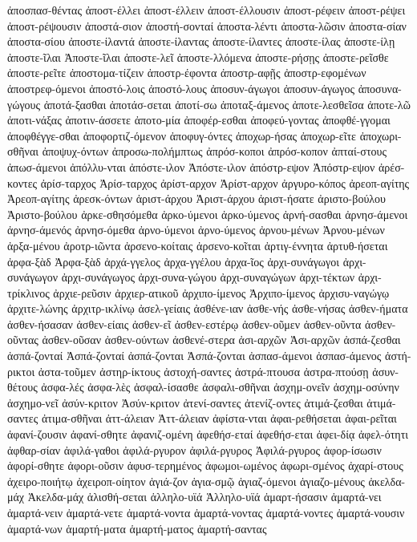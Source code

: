 {ἀποσπασ-θέντας
ἀποστ-έλλει
ἀποστ-έλλειν
ἀποστ-έλλουσιν
ἀποστ-ρέφειν
ἀποστ-ρέψει
ἀποστ-ρέψουσιν
ἀποστά-σιον
ἀποστή-σονταί
ἀποστα-λέντι
ἀποστα-λῶσιν
ἀποστα-σίαν
ἀποστα-σίου
ἀποστε-ίλαντά
ἀποστε-ίλαντας
ἀποστε-ίλαντες
ἀποστε-ίλας
ἀποστε-ίλῃ
ἀποστε-ῖλαι
Ἀποστε-ῖλαι
ἀποστε-λεῖ
ἀποστε-λλόμενα
ἀποστε-ρήσῃς
ἀποστε-ρεῖσθε
ἀποστε-ρεῖτε
ἀποστομα-τίζειν
ἀποστρ-έφοντα
ἀποστρ-αφῇς
ἀποστρ-εφομένων
ἀποστρεφ-όμενοι
ἀποστό-λοις
ἀποστό-λους
ἀποσυν-άγωγοι
ἀποσυν-άγωγος
ἀποσυνα-γώγους
ἀποτά-ξασθαι
ἀποτάσ-σεται
ἀποτί-σω
ἀποταξ-άμενος
ἀποτε-λεσθεῖσα
ἀποτε-λῶ
ἀποτι-νάξας
ἀποτιν-άσσετε
ἀποτο-μία
ἀποφέρ-εσθαι
ἀποφεύ-γοντας
ἀποφθέ-γγομαι
ἀποφθέγγε-σθαι
ἀποφορτιζ-όμενον
ἀποφυγ-όντες
ἀποχωρ-ήσας
ἀποχωρ-εῖτε
ἀποχωρι-σθῆναι
ἀποψυχ-όντων
ἀπροσω-πολήμπτως
ἀπρόσ-κοποι
ἀπρόσ-κοπον
ἀπταί-στους
ἀπωσ-άμενοι
ἀπόλλυ-νται
ἀπόστε-ιλον
Ἀπόστε-ιλον
ἀπόστρ-εψον
Ἀπόστρ-εψον
ἀρέσ-κοντες
ἀρίσ-ταρχος
Ἀρίσ-ταρχος
ἀρίστ-αρχον
Ἀρίστ-αρχον
ἀργυρο-κόπος
ἀρεοπ-αγίτης
Ἀρεοπ-αγίτης
ἀρεσκ-όντων
ἀριστ-άρχου
Ἀριστ-άρχου
ἀριστ-ήσατε
ἀριστο-βούλου
Ἀριστο-βούλου
ἀρκε-σθησόμεθα
ἀρκο-ύμενοι
ἀρκο-ύμενος
ἀρνή-σασθαι
ἀρνησ-άμενοι
ἀρνησ-άμενός
ἀρνησ-όμεθα
ἀρνο-ύμενοι
ἀρνο-ύμενος
ἀρνου-μένων
Ἀρνου-μένων
ἀρξα-μένου
ἀροτρ-ιῶντα
ἀρσενο-κοίταις
ἀρσενο-κοῖται
ἀρτιγ-έννητα
ἀρτυθ-ήσεται
ἀρφα-ξὰδ
Ἀρφα-ξὰδ
ἀρχά-γγελος
ἀρχα-γγέλου
ἀρχα-ῖος
ἀρχι-συνάγωγοι
ἀρχι-συνάγωγον
ἀρχι-συνάγωγος
ἀρχι-συνα-γώγου
ἀρχι-συναγώγων
ἀρχι-τέκτων
ἀρχι-τρίκλινος
ἀρχιε-ρεῦσιν
ἀρχιερ-ατικοῦ
ἀρχιπο-ίμενος
Ἀρχιπο-ίμενος
ἀρχισυ-ναγώγῳ
ἀρχιτε-λώνης
ἀρχιτρ-ικλίνῳ
ἀσελ-γείαις
ἀσθένε-ιαν
ἀσθε-νής
ἀσθε-νήσας
ἀσθεν-ήματα
ἀσθεν-ήσασαν
ἀσθεν-είαις
ἀσθεν-εῖ
ἀσθεν-εστέρῳ
ἀσθεν-οῦμεν
ἀσθεν-οῦντα
ἀσθεν-οῦντας
ἀσθεν-οῦσαν
ἀσθεν-ούντων
ἀσθενέ-στερα
ἀσι-αρχῶν
Ἀσι-αρχῶν
ἀσπά-ζεσθαι
ἀσπά-ζονταί
Ἀσπά-ζονταί
ἀσπά-ζονται
Ἀσπά-ζονται
ἀσπασ-άμενοι
ἀσπασ-άμενος
ἀστή-ρικτοι
ἀστα-τοῦμεν
ἀστηρ-ίκτους
ἀστοχή-σαντες
ἀστρά-πτουσα
ἀστρα-πτούσῃ
ἀσυν-θέτους
ἀσφα-λές
ἀσφα-λὲς
ἀσφαλ-ίσασθε
ἀσφαλι-σθῆναι
ἀσχημ-ονεῖν
ἀσχημ-οσύνην
ἀσχημο-νεῖ
ἀσύν-κριτον
Ἀσύν-κριτον
ἀτενί-σαντες
ἀτενίζ-οντες
ἀτιμά-ζεσθαι
ἀτιμά-σαντες
ἀτιμα-σθῆναι
ἀττ-άλειαν
Ἀττ-άλειαν
ἀφίστα-νται
ἀφαι-ρεθήσεται
ἀφαι-ρεῖται
ἀφανί-ζουσιν
ἀφανί-σθητε
ἀφανιζ-ομένη
ἀφεθήσ-εταί
ἀφεθήσ-εται
ἀφει-δίᾳ
ἀφελ-ότητι
ἀφθαρ-σίαν
ἀφιλά-γαθοι
ἀφιλά-ργυρον
ἀφιλά-ργυρος
Ἀφιλά-ργυρος
ἀφορ-ίσωσιν
ἀφορί-σθητε
ἀφορι-οῦσιν
ἀφυσ-τερημένος
ἀφωμοι-ωμένος
ἀφωρι-σμένος
ἀχαρί-στους
ἀχειρο-ποιήτῳ
ἀχειροπ-οίητον
ἁγιά-ζον
ἁγια-σμῷ
ἁγιαζ-όμενοι
ἁγιαζο-μένους
ἁκελδα-μάχ
Ἁκελδα-μάχ
ἁλισθή-σεται
ἁλληλο-υϊά
Ἁλληλο-υϊά
ἁμαρτ-ήσασιν
ἁμαρτά-νει
ἁμαρτά-νειν
ἁμαρτά-νετε
ἁμαρτά-νοντα
ἁμαρτά-νοντας
ἁμαρτά-νοντες
ἁμαρτά-νουσιν
ἁμαρτά-νων
ἁμαρτή-ματα
ἁμαρτή-ματος
ἁμαρτή-σαντας
}
